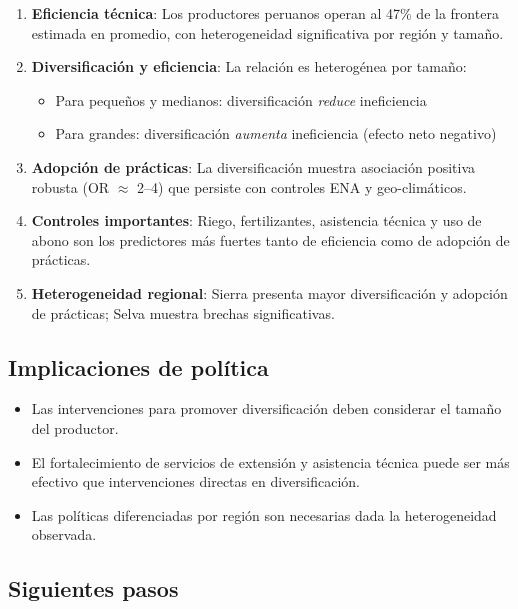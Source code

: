 \documentclass[11pt,a4paper]{article}
\begin{document}
\begin{enumerate}
    \item \textbf{Eficiencia técnica}: Los productores peruanos operan al 47\% de la frontera estimada en promedio, con heterogeneidad significativa por región y tamaño.
    
    \item \textbf{Diversificación y eficiencia}: La relación es heterogénea por tamaño:
    \begin{itemize}
        \item Para pequeños y medianos: diversificación \textit{reduce} ineficiencia
        \item Para grandes: diversificación \textit{aumenta} ineficiencia (efecto neto negativo)
    \end{itemize}
    
    \item \textbf{Adopción de prácticas}: La diversificación muestra asociación positiva robusta (OR $\approx$ 2--4) que persiste con controles ENA y geo-climáticos.
    
    \item \textbf{Controles importantes}: Riego, fertilizantes, asistencia técnica y uso de abono son los predictores más fuertes tanto de eficiencia como de adopción de prácticas.
    
    \item \textbf{Heterogeneidad regional}: Sierra presenta mayor diversificación y adopción de prácticas; Selva muestra brechas significativas.
\end{enumerate}

\subsection{Implicaciones de política}

\begin{itemize}
    \item Las intervenciones para promover diversificación deben considerar el tamaño del productor.
    \item El fortalecimiento de servicios de extensión y asistencia técnica puede ser más efectivo que intervenciones directas en diversificación.
    \item Las políticas diferenciadas por región son necesarias dada la heterogeneidad observada.
\end{itemize}

\subsection{Siguientes pasos}
\end{document}
